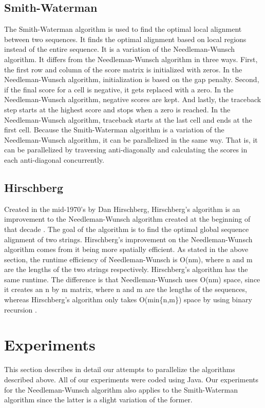 \documentclass[conference]{IEEEtran}
\begin{document}
\subsection{Smith-Waterman}
The Smith-Waterman algorithm is used to find the optimal local alignment between two sequences. It finds the optimal alignment based on local regions instead of the entire sequence. It is a variation of the Needleman-Wunsch algorithm. It differs from the Needleman-Wunsch algorithm in three ways. First, the first row and column of the score matrix is initialized with zeros. In the Needleman-Wunsch algorithm, initialization is based on the gap penalty. Second, if the final score for a cell is negative, it gets replaced with a zero. In the Needleman-Wunsch algorithm, negative scores are kept. And lastly, the traceback step starts at the highest score and stops when a zero is reached. In the Needleman-Wunsch algorithm, traceback starts at the last cell and ends at the first cell. Because the Smith-Waterman algorithm is a variation of the Needleman-Wunsch algorithm, it can be parallelized in the same way. That is, it can be parallelized by traversing anti-diagonally and calculating the scores in each anti-diagonal concurrently.

\subsection{Hirschberg}
Created in the mid-1970’s by Dan Hirschberg, Hirschberg’s algorithm is an improvement to the Needleman-Wunsch algorithm created at the beginning of that decade \cite{hirschberg_1975}. The goal of the algorithm is to find the optimal global sequence alignment of two strings. Hirschberg’s improvement on the Needleman-Wunsch algorithm comes from it being more spatially efficient. As stated in the above section, the runtime efficiency of Needleman-Wunsch is O(nm), where n and m are the lengths of the two strings respectively. Hirschberg’s algorithm has the same runtime. The difference is that Needleman-Wunsch uses O(nm) space, since it creates an n by m matrix, where n and m are the lengths of the sequences, whereas Hirschberg’s algorithm only takes O(min\{n,m\}) space by using binary recursion \cite{edit_distance_revisited}.

\section{Experiments}

This section describes in detail our attempts to parallelize the algorithms described above. All of our experiments were coded using Java. Our experiments for the Needleman-Wunsch algorithm also applies to the Smith-Waterman algorithm since the latter is a slight variation of the former.
\end{document}
